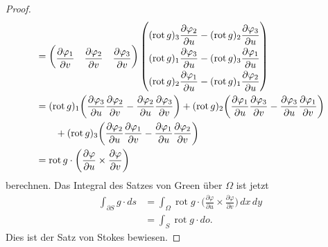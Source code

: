 \begin{proof}
\begin{align*}
&=
\begin{pmatrix}
\displaystyle
\frac{\partial \varphi_1}{\partial v}&
\displaystyle
\frac{\partial \varphi_2}{\partial v}&
\displaystyle
\frac{\partial \varphi_3}{\partial v}
\end{pmatrix}
{\renewcommand{\arraystretch}{2.0}
\begin{pmatrix}
\displaystyle
(\operatorname{rot}g)_3 \frac{\partial\varphi_2}{\partial u}
-
(\operatorname{rot}g)_2 \frac{\partial\varphi_3}{\partial u}
\\
\displaystyle
(\operatorname{rot}g)_1 \frac{\partial\varphi_3}{\partial u}
-
(\operatorname{rot}g)_3 \frac{\partial\varphi_1}{\partial u}
\\
\displaystyle
(\operatorname{rot}g)_2 \frac{\partial\varphi_1}{\partial u}
-
(\operatorname{rot}g)_1 \frac{\partial\varphi_2}{\partial u}
\end{pmatrix}}
\\
&=
(\operatorname{rot}g)_1
\biggl(
\frac{\partial\varphi_3}{\partial u}
\frac{\partial\varphi_2}{\partial v}
-
\frac{\partial\varphi_2}{\partial u}
\frac{\partial\varphi_3}{\partial v}
\biggr)
+
(\operatorname{rot}g)_2
\biggl(
\frac{\partial\varphi_1}{\partial u}
\frac{\partial\varphi_3}{\partial v}
-
\frac{\partial\varphi_3}{\partial u}
\frac{\partial\varphi_1}{\partial v}
\biggr)
\\
&\qquad
+
(\operatorname{rot}g)_3
\biggl(
\frac{\partial\varphi_2}{\partial u}
\frac{\partial\varphi_1}{\partial v}
-
\frac{\partial\varphi_1}{\partial u}
\frac{\partial\varphi_2}{\partial v}
\biggr)
\\
&=
\operatorname{rot}g\cdot
\biggl(
\frac{\partial\varphi}{\partial u}
\times
\frac{\partial\varphi}{\partial v}
\biggr)
\end{align*}
berechnen.
Das Integral des Satzes von Green über $\Omega$ ist jetzt
\begin{align*}
\int_{\partial S} g\cdot ds
&=
\int_\Omega
\operatorname{rot}g
\cdot
\biggl(
\frac{\partial\varphi}{\partial u}
\times
\frac{\partial\varphi}{\partial v}
\biggr)\,dx\,dy
\\
&=
\int_S
\operatorname{rot} g
\cdot
do.
\end{align*}
Dies ist der Satz von Stokes bewiesen.
\end{proof}

%
%
